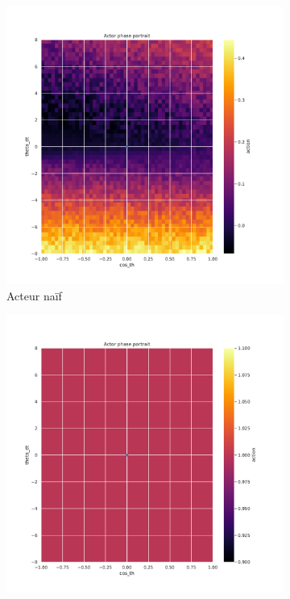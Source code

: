 \begin{figure}[H]
    \centering
    \begin{subfigure}{0.3\textwidth}
        \includegraphics[width=\textwidth]{figures/prelimaire/0_actor_sum__ante_Pendulum-v0.pdf}
        \caption{Acteur naïf}
    \end{subfigure}
    \begin{subfigure}{0.3\textwidth}
        \includegraphics[width=\textwidth]{figures/prelimaire/0_actor_sum__post_Pendulum-v0.pdf}

\end{subfigure}
\end{figure}
